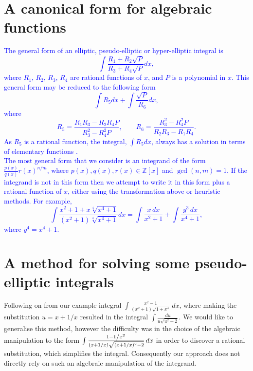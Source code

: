 \documentclass[12pt]{article}
\numberwithin{equation}{section}
\theoremstyle{definition}
\begin{document}
\section{A canonical form for algebraic functions}
\textcolor{blue}{%
The general form of an elliptic, pseudo-elliptic or hyper-elliptic integral is 
\begin{equation*}
\int \frac{R_1 + R_2 \sqrt{P}}{R_3 + R_4 \sqrt{P}}dx,
\end{equation*}
where $R_1$, $R_2$, $R_3$, $R_4$ are rational functions of $x$, and $P$ is a 
polynomial in $x$. This general form may be reduced to the following form 
\begin{equation*}
\int R_5 dx + \int \frac{\sqrt{P}}{R_6}dx,
\end{equation*}
where
\begin{equation*}
R_5 = \frac{R_1 R_3 - R_2 R_4 P}{R_3^2 - R_4^2 P}, \qquad R_6 = \frac{R_3^2 - R_4^2 P}{R_2R_3 - R_1 R_4}.
\end{equation*}
As $R_5$ is a rational function, the integral, $\int R_5 dx$, always has a solution in terms of 
elementary functions \cite{Bronstein1997}\cite{Byrd1954}. \\
%
The most general form that we consider is an integrand of the form $\frac{p(x)}{q(x)}r(x)^{n/m}$, where 
$p(x),q(x),r(x)\in \mathbb{Z}[x]$ and $\gcd (n,m)=1$. If the integrand is not in this form 
then we attempt to write it in this form plus a rational function of $x$, either using the 
transformation above or heuristic methods. For example, 
\begin{equation*}
\int\frac{x^2+1+x\sqrt[4]{x^4+1}}{\left(x^2+1\right) \sqrt[4]{x^4+1}}dx = 
\int\frac{x\,dx}{x^2+1} + \int\frac{y^3\,dx}{x^4+1},
\end{equation*}
where $y^4 = x^4+1$.}
\fi

\section{A method for solving some pseudo-elliptic integrals}
Following on from our example integral $\int \frac{x^2-1}{\left(x^2+1\right)\sqrt{1+x^4}} \, dx$, 
where making the substitution $u=x+1/x$ resulted in the integral $\int \frac{du}{u\sqrt{u^2-2}}$. 
We would like to generalise this method, however the difficulty was in the choice of the algebraic 
manipulation to the form 
$\int\frac{1-1\left/x^2\right.}{(x+1/x)\sqrt{(x+1/x)^2-2}} \, dx$ in order to discover a rational 
substitution, which simplifies the integral. Consequently our approach does not directly rely 
on such an algebraic manipulation of the integrand. \\
\end{document}
